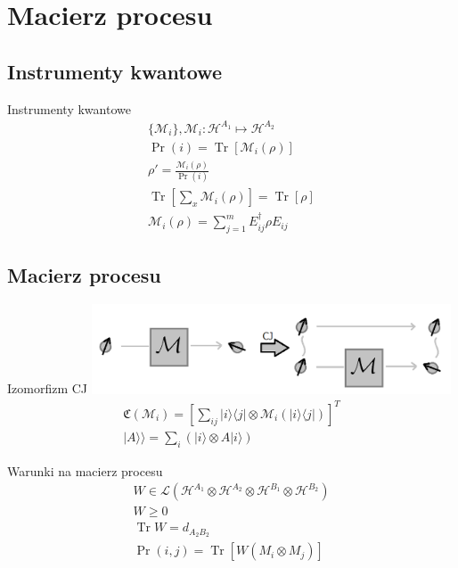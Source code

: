 \documentclass{beamer}
\newcommand{\Mats}[1]{\mathcal{L}(#1)}
\newcommand{\Hx}[1]{\mathcal{H}^{#1}}
\newcommand{\Ket}[1]{|#1\rangle}
\newcommand{\Bra}[1]{\langle#1|}
\newcommand{\KKet}[1]{|#1\rangle\rangle}
\DeclareMathOperator{\Trs}{Tr}
\begin{document}
\section{Macierz procesu}
\subsection{Instrumenty kwantowe}
\begin{frame}{Instrumenty kwantowe}
\centering
\begin{gather}
 \{\mathcal{M}_i\}, \mathcal{M}_i: \Hx{A_1}\mapsto \Hx{A_2} \\
\Pr(i) = \Trs\left[\mathcal{M}_i(\rho)\right] \\
\rho' = \frac{\mathcal{M}_i(\rho)}{\Pr(i)} \\
\Trs \left[ \sum_x \mathcal{M}_i(\rho) \right] = \Trs\left[\rho\right] \\ 
\mathcal{M}_i({\rho}) = \sum^m_{j=1} E_{ij} ^\dag \rho E_{ij}
\end{gather}
\end{frame}
\subsection{Macierz procesu}
\begin{frame}{Izomorfizm CJ}
\includegraphics[width=0.8\textwidth]{obrazki/cj_new}
\begin{gather}
\mathfrak{C}(\mathcal{M}_i) = \left[\sum_{ij} \Ket{i}\Bra{j} \otimes \mathcal{M}_i\left(\Ket{i}\Bra{j}\right)\right]^T\\
\KKet{A} = \sum_i \left( \Ket{i}\otimes A\Ket{i}\right)
\end{gather}
\end{frame}

\begin{frame}{Warunki na macierz procesu}
\centering
\begin{gather}
W  \in \Mats{\Hx{A_1} \otimes \Hx{A_2} \otimes \Hx{B_1} \otimes \Hx{B_2}}\\
W \geq 0 \\
\Trs W=d_{A_2B_2}\\
\Pr(i,j) = \Trs\left[ W \left( M_i \otimes M_j\right)\right]
\end{gather}
\end{frame}
\end{document}
